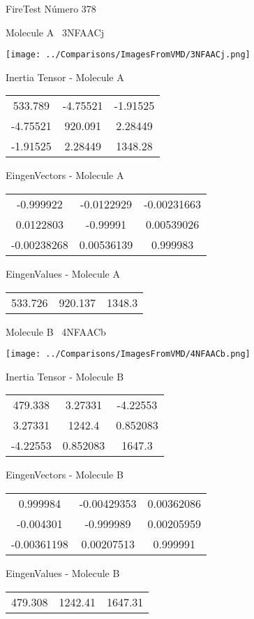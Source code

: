 \vtab[-3cm]
\begin{center}
{\large FireTest \tab Número 378}
\end{center}
\begin{multicols}{2}
\begin{center}

Molecule A \
3NFAACj

\texttt{[image: ../Comparisons/ImagesFromVMD/3NFAACj.png]}

Inertia Tensor - Molecule A \\
\begin{tabular}{|c c c|}
533.789	 & 	-4.75521	 & 	-1.91525	 \\
-4.75521	 & 	920.091	 & 	2.28449	 \\
-1.91525	 & 	2.28449	 & 	1348.28
\end{tabular}

\vtab
 EingenVectors - Molecule A     \\
\begin{tabular}{|c c c|}
-0.999922	 & 	-0.0122929	 & 	-0.00231663	 \\
0.0122803	 & 	-0.99991	 & 	0.00539026	 \\
-0.00238268	 & 	0.00536139	 & 	0.999983
\end{tabular}

\vtab
 EingenValues - Molecule A     \\
\begin{tabular}{|c c c|}
533.726	 & 	920.137	 & 	1348.3	 \\
\end{tabular}
\columnbreak

Molecule B \
4NFAACb

\texttt{[image: ../Comparisons/ImagesFromVMD/4NFAACb.png]}

Inertia Tensor - Molecule B \\
\begin{tabular}{|c c c|}
479.338	 & 	3.27331	 & 	-4.22553	 \\
3.27331	 & 	1242.4	 & 	0.852083	 \\
-4.22553	 & 	0.852083	 & 	1647.3
\end{tabular}

\vtab
 EingenVectors - Molecule B     \\
\begin{tabular}{|c c c|}
0.999984	 & 	-0.00429353	 & 	0.00362086	 \\
-0.004301	 & 	-0.999989	 & 	0.00205959	 \\
-0.00361198	 & 	0.00207513	 & 	0.999991
\end{tabular}

\vtab
 EingenValues - Molecule B     \\
\begin{tabular}{|c c c|}
479.308	 & 	1242.41	 & 	1647.31	 \\
\end{tabular}

\end{center}
\end{multicols}

